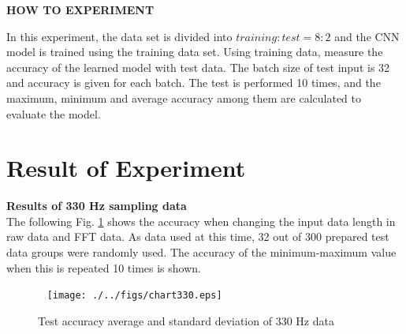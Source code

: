 \documentclass[letterpaper,  10 pt,  conference]{ieeeconf}  %
\begin{document}




\textbf{HOW TO EXPERIMENT}


In this experiment,  the data set is divided into 
$training: test = 8: 2$
and the CNN model is trained using the training data set. 
Using training data,  measure the accuracy of the learned model with test data. The batch size of test input is 32 and accuracy is given for each batch.  
The test is performed 10 times,  and the maximum,  minimum and average accuracy among them are calculated to evaluate the model. 


\section{%
Result of Experiment}
\textbf{Results of 330 Hz sampling data}\\
The following Fig. \ref{330_ave_stddev} shows the accuracy when changing the input data length in raw data and FFT data.  As data used at this time,  32 out of 300 prepared 
test data groups were randomly used. The accuracy of the minimum-maximum value when this is repeated 10 times is shown. \\


\begin{figure}[thpb]
    \centering



    \texttt{[image: ./../figs/chart330.eps]}
    \caption{
        Test accuracy average and standard deviation of 330 Hz data
    }
    \label{330_ave_stddev}
 \end{figure}
\end{document}
